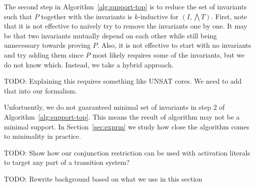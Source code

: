 The second step in Algorithm~\ref{alg:support-top} is to reduce the
set of invariants such that $P$ together with the invariants is
$k$-inductive for $(I, \bigwedge T)$. First, note that it is not
effective to naively try to remove the invariants one by one. It may
be that two invariants mutually depend on each other while still being
unnecessary towards proving $P$. Also, it is not effective to start
with no invariants and try adding them since $P$ most likely requires
some of the invariants, but we do not know which. Instead, we take a
hybrid approach.

TODO: Explaining this requires something like UNSAT cores. We need to
add that into our formalism.

Unfortuently, we do not guaranteed minimal set of invariants in step 2
of Algorithm~\ref{alg:support-top}. This means the result of algorithm
may not be a minimal support. In Section~\ref{sec:exprm} we study how
close the algorithm comes to minimality in practice.

TODO: Show how our conjunction restriction can be used with activation
literals to target any part of a transition system?

TODO: Rewrite background based on what we use in this section


